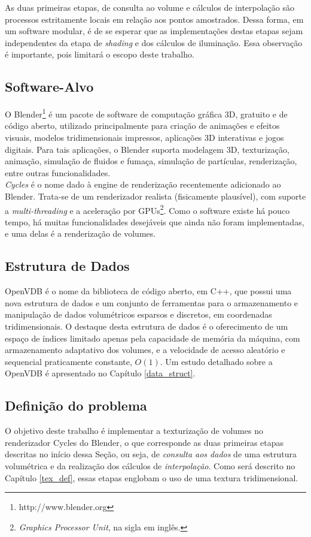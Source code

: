 As duas primeiras etapas, de consulta ao volume e cálculos de interpolação são processos estritamente locais em relação aos pontos amostrados. Dessa forma, em um software modular, é de se esperar que as implementações destas etapas sejam independentes da etapa de \emph{shading} e dos cálculos de iluminação. Essa observação é importante, pois limitará o escopo deste trabalho.

\subsection*{Software-Alvo}
O Blender\footnote{http://www.blender.org} é um pacote de software de computação gráfica 3D, gratuito e de código aberto, utilizado principalmente para criação de animações e efeitos visuais, modelos tridimensionais impressos, aplicações 3D interativas e jogos digitais. Para tais aplicações, o Blender suporta modelagem 3D, texturização, animação, simulação de fluidos e fumaça, simulação de partículas, renderização, entre outras funcionalidades. \\

\emph{Cycles} é o nome dado à engine de renderização recentemente adicionado ao Blender. Trata-se de um renderizador realista (fisicamente plausível), com suporte a \emph{multi-threading} e a aceleração por GPUs\footnote{\emph{Graphics Processor Unit}, na sigla em inglês.}. Como o software existe há pouco tempo, há muitas funcionalidades desejáveis que ainda não foram implementadas, e uma delas é a renderização de volumes.

\subsection*{Estrutura de Dados}
OpenVDB é o nome da biblioteca de código aberto, em C++, que possui uma nova estrutura de dados e um conjunto de ferramentas para o armazenamento e manipulação de dados volumétricos esparsos e discretos, em coordenadas tridimensionais. O destaque desta estrutura de dados é o oferecimento de um espaço de índices limitado apenas pela capacidade de memória da máquina, com armazenamento adaptativo dos volumes, e a velocidade de acesso aleatório e sequencial praticamente constante, $O(1)$. Um estudo detalhado sobre a OpenVDB é apresentado no Capítulo \ref{data_struct}.

\subsection*{Definição do problema}
\label{def_problem}
O objetivo deste trabalho é implementar a texturização de volumes no renderizador Cycles do Blender, o que corresponde as duas primeiras etapas descritas no início dessa Seção, ou seja, de \emph{consulta aos dados} de uma estrutura volumétrica e da realização dos cálculos de \emph{interpolação}. Como será descrito no Capítulo \ref{tex_def}, essas etapas englobam o uso de uma textura tridimensional.\\

